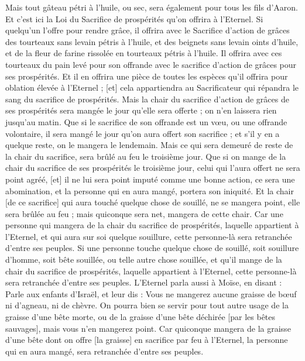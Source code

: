 \begin{multicols}{2}
Mais tout gâteau pétri à l'huile, ou sec, sera également pour tous les fils d'Aaron.
Et c'est ici la Loi du Sacrifice de prospérités qu'on offrira à l'Eternel.
Si quelqu'un l'offre pour rendre grâce, il offrira avec le Sacrifice d'action de grâces des tourteaux sans levain pétris à l'huile, et des beignets sans levain oints d'huile, et de la fleur de farine rissolée en tourteaux pétris à l'huile.
Il offrira avec ces tourteaux du pain levé pour son offrande avec le sacrifice d'action de grâces pour ses prospérités.
Et il en offrira une pièce de toutes les espèces qu'il offrira pour oblation élevée à l'Eternel ; [et] cela appartiendra au Sacrificateur qui répandra le sang du sacrifice de prospérités.
Mais la chair du sacrifice d'action de grâces de ses prospérités sera mangée le jour qu'elle sera offerte ; on n'en laissera rien jusqu'au matin.
Que si le sacrifice de son offrande est un vœu, ou une offrande volontaire, il sera mangé le jour qu'on aura offert son sacrifice ; et s'il y en a quelque reste, on le mangera le lendemain.
Mais ce qui sera demeuré de reste de la chair du sacrifice, sera brûlé au feu le troisième jour.
Que si on mange de la chair du sacrifice de ses prospérités le troisième jour, celui qui l'aura offert ne sera point agréé, [et] il ne lui sera point imputé comme une bonne action, ce sera une abomination, et la personne qui en aura mangé, portera son iniquité.
Et la chair [de ce sacrifice] qui aura touché quelque chose de souillé, ne se mangera point, elle sera brûlée au feu ; mais quiconque sera net, mangera de cette chair.
Car une personne qui mangera de la chair du sacrifice de prospérités, laquelle appartient à l'Eternel, et qui aura sur soi quelque souillure, cette personne-là sera retranchée d'entre ses peuples.
Si une personne touche quelque chose de souillé, soit souillure d'homme, soit bête souillée, ou telle autre chose souillée, et qu'il mange de la chair du sacrifice de prospérités, laquelle appartient à l'Eternel, cette personne-là sera retranchée d'entre ses peuples.
L'Eternel parla aussi à Moïse, en disant :
Parle aux enfants d'Israël, et leur dis : Vous ne mangerez aucune graisse de bœuf ni d'agneau, ni de chèvre.
On pourra bien se servir pour tout autre usage de la graisse d'une bête morte, ou de la graisse d'une bête déchirée [par les bêtes sauvages], mais vous n'en mangerez point.
Car quiconque mangera de la graisse d'une bête dont on offre [la graisse] en sacrifice par feu à l'Eternel, la personne qui en aura mangé, sera retranchée d'entre ses peuples.

\end{multicols}
